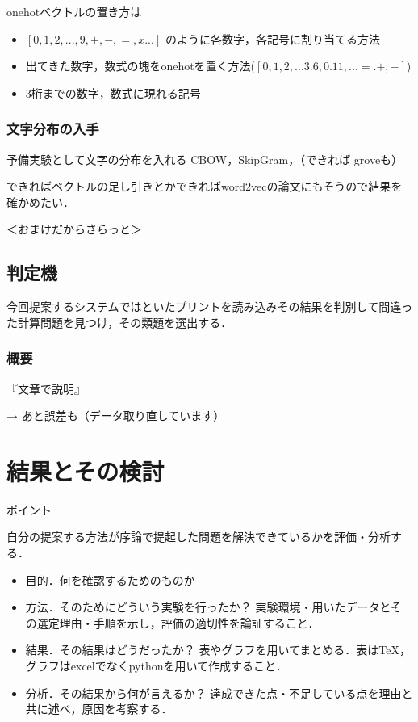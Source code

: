 \documentclass[a4j,11pt,report]{jsbook}
\newcommand{\point}[1]{
\begin{itembox}[l]{ポイント}
  #1
\end{itembox}
}
\begin{document}
onehotベクトルの置き方は
\begin{itemize}
  \item $[0,1,2, ... ,9,+,-,=,x ...]$ のように各数字，各記号に割り当てる方法
  \item 出てきた数字，数式の塊をonehotを置く方法($[0,1,2, ... 3.6,0.11,...=.+,-]$)
  \item 3桁までの数字，数式に現れる記号
\end{itemize}


\subsection{文字分布の入手}
予備実験として文字の分布を入れる
CBOW，SkipGram，（できれば groveも）

できればベクトルの足し引きとかできればword2vecの論文にもそうので結果を確かめたい．




＜おまけだからさらっと＞
\section{判定機}
今回提案するシステムではといたプリントを読み込みその結果を判別して間違った計算問題を見つけ，その類題を選出する．
\subsection{概要}


『文章で説明』


→ あと誤差も（データ取り直しています）

\clearpage










\chapter{結果とその検討 \label{ch:result}}

\point{
自分の提案する方法が序論で提起した問題を解決できているかを評価・分析する．
\begin{itemize}
  \item 目的．何を確認するためのものか
  \item 方法．そのためにどういう実験を行ったか？ 実験環境・用いたデータとその選定理由・手順を示し，評価の適切性を論証すること．
  \item 結果．その結果はどうだったか？ 表やグラフを用いてまとめる．表はTeX，グラフはexcelでなくpythonを用いて作成すること．
  \item 分析．その結果から何が言えるか？ 達成できた点・不足している点を理由と共に述べ，原因を考察する．
\end{itemize}
}
\end{document}
